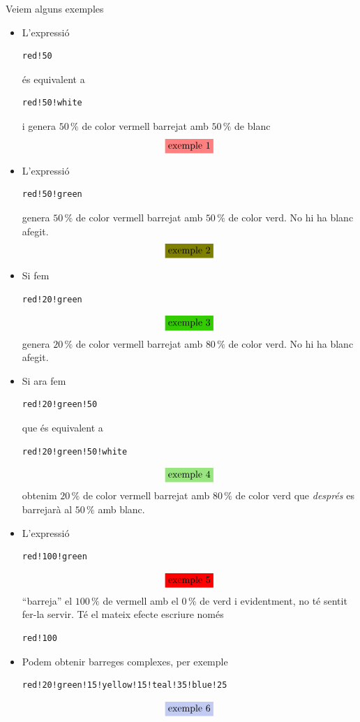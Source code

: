 \documentclass[a4paper,12pt]{article}
\begin{document}
Veiem alguns exemples
\begin{itemize}
\item
L'expressió
\begin{verbatim}
red!50
\end{verbatim}
és equivalent a 
\begin{verbatim}
red!50!white
\end{verbatim}
i genera $50\,\%$ de color vermell barrejat amb $50\,\%$ de blanc
$$\colorbox{red!50}{exemple 1}$$
\item
L'expressió
\begin{verbatim}
red!50!green
\end{verbatim}
genera $50\,\%$ de color vermell barrejat amb $50\,\%$ de color verd. No hi ha blanc afegit.
$$\colorbox{red!50!green}{exemple 2}$$
\item
Si fem
\begin{verbatim}
red!20!green
\end{verbatim}
$$\colorbox{red!20!green}{exemple 3}$$
genera $20\,\%$ de color vermell barrejat amb $80\,\%$ de color verd. No hi ha blanc afegit.
\item
Si ara fem
\begin{verbatim}
red!20!green!50
\end{verbatim}
que és equivalent a 
\begin{verbatim}
red!20!green!50!white
\end{verbatim}
$$\colorbox{red!20!green!50}{exemple 4}$$
obtenim $20\,\%$ de color vermell barrejat amb $80\,\%$ de color verd que \emph{després} es barrejarà al $50\,\%$ amb blanc.
\item
L'expressió
\begin{verbatim}
red!100!green
\end{verbatim}
$$\colorbox{red!100!green}{exemple 5}$$
``barreja'' el $100\,\%$ de vermell amb el $0\,\%$ de verd i evidentment, no té sentit fer-la servir. Té el mateix efecte escriure només 
\begin{verbatim}
red!100
\end{verbatim}

\item
Podem obtenir barreges complexes, per exemple
\begin{verbatim}
red!20!green!15!yellow!15!teal!35!blue!25
\end{verbatim}
$$\colorbox{red!20!green!15!yellow!15!teal!35!blue!25}{exemple 6}$$
\end{itemize}
\bigskip
\end{document}
